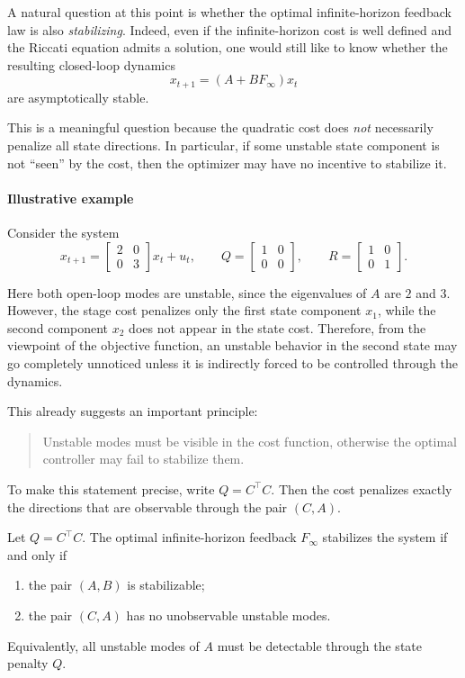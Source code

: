A natural question at this point is whether the optimal infinite-horizon
feedback law is also \emph{stabilizing}.  
Indeed, even if the infinite-horizon cost is well defined and the Riccati
equation admits a solution, one would still like to know whether the
resulting closed-loop dynamics
\[
x_{t+1} = (A + B F_\infty)x_t
\]
are asymptotically stable.

This is a meaningful question because the quadratic cost does \emph{not}
necessarily penalize all state directions. In particular, if some unstable
state component is not ``seen'' by the cost, then the optimizer may have
no incentive to stabilize it.

\paragraph{Illustrative example}

Consider the system
\[
x_{t+1} =
\begin{bmatrix}
2 & 0\\
0 & 3
\end{bmatrix}x_t + u_t,
\qquad
Q =
\begin{bmatrix}
1 & 0\\
0 & 0
\end{bmatrix},
\qquad
R =
\begin{bmatrix}
1 & 0\\
0 & 1
\end{bmatrix}.
\]

Here both open-loop modes are unstable, since the eigenvalues of \(A\) are
\(2\) and \(3\). However, the stage cost penalizes only the first state
component \(x_1\), while the second component \(x_2\) does not appear in
the state cost. Therefore, from the viewpoint of the objective function,
an unstable behavior in the second state may go completely unnoticed
unless it is indirectly forced to be controlled through the dynamics.

This already suggests an important principle:

\begin{quote}
Unstable modes must be visible in the cost function, otherwise the optimal
controller may fail to stabilize them.
\end{quote}

To make this statement precise, write $Q = C^\top C$.
Then the cost penalizes exactly the directions that are observable through
the pair \((C,A)\).

\begin{theorembox}
Let \(Q = C^\top C\).  
The optimal infinite-horizon feedback \(F_\infty\) stabilizes the system
if and only if
\begin{enumerate}
    \item the pair \((A,B)\) is stabilizable;
    \item the pair \((C,A)\) has no unobservable unstable modes.
\end{enumerate}
Equivalently, all unstable modes of \(A\) must be detectable through the
state penalty \(Q\).
\end{theorembox}

